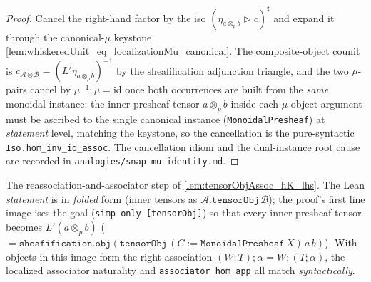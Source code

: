 \begin{proof}
  Cancel the right-hand factor by the iso \((\eta_{a\otimes_p b}\rhd c)^{\sharp}\) and expand it through
  the canonical-\(\mu\) keystone \cref{lem:whiskeredUnit_eq_localizationMu_canonical}. The composite-object
  counit is \(c_{\mathcal{A}\otimes\mathcal{B}} = (L'\eta_{a\otimes_p b})^{-1}\) by the sheafification
  adjunction triangle, and the two \(\mu\)-pairs cancel by \(\mu^{-1};\mu=\mathrm{id}\) once both
  occurrences are built from the \emph{same} monoidal instance: the inner presheaf tensor
  \(a\otimes_p b\) inside each \(\mu\) object-argument must be ascribed to the single canonical instance
  (\texttt{MonoidalPresheaf}) at \emph{statement} level, matching the keystone, so the cancellation is the
  pure-syntactic \texttt{Iso.hom\_inv\_id\_assoc}. The cancellation idiom and the dual-instance root cause
  are recorded in \texttt{analogies/snap-mu-identity.md}.
\end{proof}

\begin{lemma}

  \label{lem:tensorObjAssoc_hK_lhs_native}
  The reassociation-and-associator step of \cref{lem:tensorObjAssoc_hK_lhs}. The Lean \emph{statement}
  is in \emph{folded} form (inner tensors as \(\mathcal A.\texttt{tensorObj}\,\mathcal B\)); the proof's
  first line image-ises the goal (\texttt{simp only [tensorObj]}) so that every inner presheaf tensor
  becomes \(L'(a\otimes_p b)\) (\(=\texttt{sheafification.obj}(\texttt{tensorObj}\,(C:=\texttt{MonoidalPresheaf}\,X)\,a\,b)\)).
  With objects in this image form the right-association \((W;T);\alpha = W;(T;\alpha)\), the localized
  associator naturality and \texttt{associator\_hom\_app} all match \emph{syntactically}.
\end{lemma}

